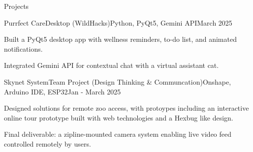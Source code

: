\documentclass[
    a4paper,
    9pt,
]{resume}
\begin{document}

\begin{rSection}{Projects}

	\begin{rSubsection}{Purrfect Care}{Desktop (WildHacks)}{Python, PyQt5, Gemini API}{March 2025}{}
		\item Built a PyQt5 desktop app with wellness reminders, to-do list, and animated notifications.
  		\item Integrated Gemini API for contextual chat with a virtual assistant cat.
	  \end{rSubsection}



\begin{rSubsection}{Skynet System}{Team Project (Design Thinking \& Communcation)}{Onshape, Arduino IDE, ESP32}{Jan - March 2025}
	  \item Designed solutions for remote zoo access, with protoypes including an interactive online tour prototype built with web technologies and a Hexbug like design.
  	\item Final deliverable: a zipline-mounted camera system enabling live video feed controlled remotely by users.
    \end{rSubsection}
    
  \end{rSection}

%



\end{document}
